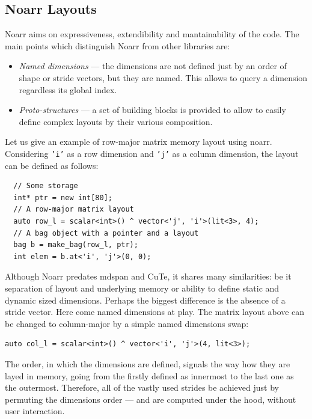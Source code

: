 
\subsection{Noarr Layouts}

Noarr aims on expressiveness, extendibility and mantainability of the code. The main points which distinguish Noarr from other libraries are:

\begin{itemize}
  \item \emph{Named dimensions} --- the dimensions are not defined just by an order of shape or stride vectors, but they are named. This allows to query a dimension regardless its global index.
  \item \emph{Proto-structures} --- a set of building blocks is provided to allow to easily define complex layouts by their various composition.
\end{itemize}

Let us give an example of row-major matrix memory layout using noarr. Considering \texttt{'i'} as a row dimension and \texttt{'j'} as a column dimension, the layout can be defined as follows:

\begin{verbatim}
  // Some storage
  int* ptr = new int[80];
  // A row-major matrix layout
  auto row_l = scalar<int>() ^ vector<'j', 'i'>(lit<3>, 4);
  // A bag object with a pointer and a layout
  bag b = make_bag(row_l, ptr);
  int elem = b.at<'i', 'j'>(0, 0);
\end{verbatim}

Although Noarr predates mdspan and CuTe, it shares many similarities: be it separation of layout and underlying memory or ability to define static and dynamic sized dimensions. Perhaps the biggest difference is the absence of a stride vector. Here come named dimensions at play. The matrix layout above can be changed to column-major by a simple named dimensions swap:
\begin{verbatim}
auto col_l = scalar<int>() ^ vector<'i', 'j'>(4, lit<3>);
\end{verbatim}
The order, in which the dimensions are defined, signals the way how they are layed in memory, going from the firstly defined as  innermost to the last one as the outermost. Therefore, all of the vastly used strides be achieved just by permuting the dimensions order --- and are computed under the hood, without user interaction.

